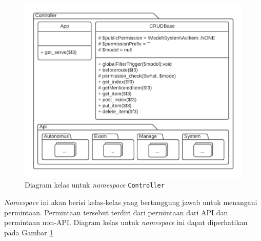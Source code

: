     \begin{figure}
        \centering
        \includegraphics{Gambar/classmap-be/Classmap - app-controller.pdf}
        \caption{Diagram kelas untuk \textit{namespace} \texttt{Controller}}
        \label{fig:classmap_app-controller}
    \end{figure}

    \textit{Namespace} ini akan berisi kelas-kelas yang bertanggung jawab untuk
    menangani permintaan. Permintaan tersebut terdiri dari permintaan dari API
    dan permintaan non-API. Diagram kelas untuk \textit{namespace} ini dapat
    diperhatikan pada Gambar
    \ref{fig:classmap_app-controller}
    
